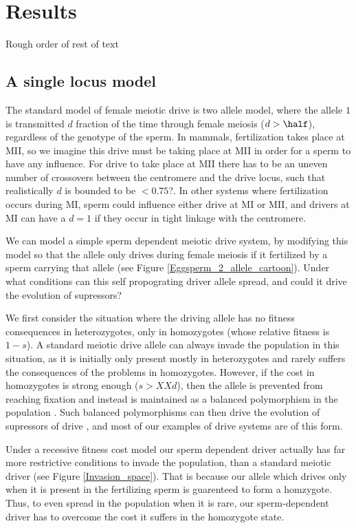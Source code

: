 \documentclass[12pt,letterpaper]{article}
\begin{document}
\section*{Results}



Rough order of rest of text
\subsection*{A single locus model} 
The standard model of female meiotic drive is two allele model, where the
allele $1$ is transmitted $d$ fraction of the time through female
meiosis ($d > \half$), regardless of the genotype of the sperm. 
In mammals, fertilization takes place at MII, so we imagine this drive must be taking place at MII in order
for a sperm to have any influence. For drive to take place at MII there has to be an uneven number of
 crossovers between the centromere and the drive locus, such that realistically $d$ is bounded to be $<0.75$?. 
In other systems where fertilization occurs during MI, sperm could influence either drive at MI or MII, 
and drivers at MI can have a $d=1$ if they occur in tight linkage with the centromere.

We can model a simple sperm dependent meiotic drive system, by
modifying this model so that the allele only drives during female
meiosis if it fertilized by a sperm carrying that allele
 (see
Figure \ref{Eggsperm_2_allele_cartoon}). Under what conditions can
this self propograting driver allele spread, and could it drive the
evolution of supressors? 

We first consider the situation where the driving allele has no
fitness consequences in heterozygotes, only in homozygotes (whose
relative fitness is $1-s$). A standard meiotic drive allele can always
invade the population in this situation, as it is initially only
present mostly in heterozygotes and rarely suffers the consequences of
the problems in homozygotes. However, if the cost in homozygotes is
strong enough ($s>XXd$), then the allele is prevented from reaching
fixation and instead is maintained as a balanced polymorphism in the
population \citep{Prout1973}. Such balanced polymorphisms can then
drive the evolution of supressors of drive \citep{XX}, and most of our
examples of drive systems are of this form. 

Under a recessive fitness cost model our sperm dependent driver
actually has far more restrictive conditions to invade the population,
than a standard meiotic driver (see Figure \ref{Invasion_space}).
That is because our allele which drives only when it is present in the
fertilizing sperm is guarenteed to form a homzygote. Thus, 
to even spread in the population when it is rare, our sperm-dependent
driver has to overcome the cost it suffers in the homozygote state.
\end{document}
